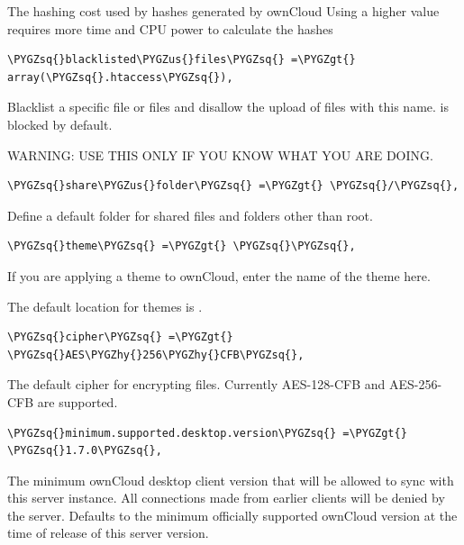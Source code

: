 \documentclass[letterpaper,10pt,english]{sphinxmanual}
\def\PYGZus{\char`\_}
\def\PYGZgt{\char`\>}
\def\PYGZhy{\char`\-}
\def\PYGZsq{\char`\'}
\begin{document}
The hashing cost used by hashes generated by ownCloud
Using a higher value requires more time and CPU power to calculate the hashes

\begin{Verbatim}[commandchars=\\\{\}]
\PYGZsq{}blacklisted\PYGZus{}files\PYGZsq{} =\PYGZgt{} array(\PYGZsq{}.htaccess\PYGZsq{}),
\end{Verbatim}

Blacklist a specific file or files and disallow the upload of files
with this name.  is blocked by default.

WARNING: USE THIS ONLY IF YOU KNOW WHAT YOU ARE DOING.

\begin{Verbatim}[commandchars=\\\{\}]
\PYGZsq{}share\PYGZus{}folder\PYGZsq{} =\PYGZgt{} \PYGZsq{}/\PYGZsq{},
\end{Verbatim}

Define a default folder for shared files and folders other than root.

\begin{Verbatim}[commandchars=\\\{\}]
\PYGZsq{}theme\PYGZsq{} =\PYGZgt{} \PYGZsq{}\PYGZsq{},
\end{Verbatim}

If you are applying a theme to ownCloud, enter the name of the theme here.

The default location for themes is .

\begin{Verbatim}[commandchars=\\\{\}]
\PYGZsq{}cipher\PYGZsq{} =\PYGZgt{} \PYGZsq{}AES\PYGZhy{}256\PYGZhy{}CFB\PYGZsq{},
\end{Verbatim}

The default cipher for encrypting files. Currently AES-128-CFB and
AES-256-CFB are supported.

\begin{Verbatim}[commandchars=\\\{\}]
\PYGZsq{}minimum.supported.desktop.version\PYGZsq{} =\PYGZgt{} \PYGZsq{}1.7.0\PYGZsq{},
\end{Verbatim}

The minimum ownCloud desktop client version that will be allowed to sync with
this server instance. All connections made from earlier clients will be denied
by the server. Defaults to the minimum officially supported ownCloud version at
the time of release of this server version.
\end{document}
